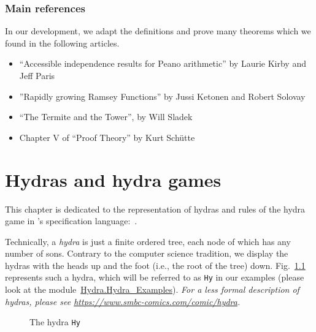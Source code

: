\subsection*{Main references}

In our development, we adapt the definitions and prove many theorems which
we found in the following articles. 
\begin{itemize}
\item ``Accessible independence results for Peano arithmetic''  by Laurie Kirby and Jeff Paris~\cite{KP82}
\item ''Rapidly growing Ramsey Functions'' by Jussi Ketonen and Robert Solovay~\cite{KS81}
\item ``The Termite and the Tower'', by Will Sladek~\cite{Sladek07thetermite}
\item Chapter V of ``Proof Theory'' by Kurt Schütte~\cite{schutte}
\end{itemize}






\chapter{Hydras and hydra games}

\label{sec:orgheadline91}
\label{chapter:hydras}




This chapter is dedicated to the representation of hydras and rules of the hydra game in \coq's specification language:~\gallina. 


Technically, a \emph{hydra} is just a finite ordered tree, each node of which 
has any number of sons. Contrary to the computer science tradition, we display the hydras 
with the heads up and the foot (i.e., the root of the tree) down.
Fig.~\ref{fig:Hy} represents such  a hydra, which will be referred to as \texttt{Hy} in our examples (please look at the 
module~\href{../theories/html/hydras.Hydra.Hydra_Examples.html}{Hydra.Hydra\_Examples}). 
\emph{For a less formal description of hydras, please see 
\url{https://www.smbc-comics.com/comic/hydra}.}

\begin{figure}[h]
\centering
{}
\caption{The hydra \texttt{Hy} \label{fig:Hy}}
\end{figure}



